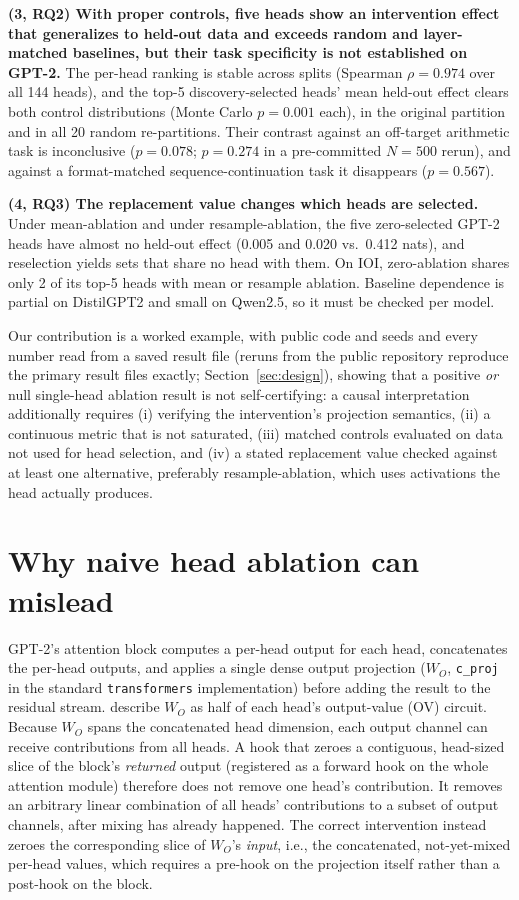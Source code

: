 \documentclass{article}
\begin{document}
\textbf{(3, RQ2) With proper controls, five heads show an
intervention effect that generalizes to held-out data and exceeds random
and layer-matched baselines, but
their task specificity is not established on GPT-2.} The per-head
ranking is stable across splits (Spearman $\rho=0.974$ over all 144
heads), and the top-5 discovery-selected heads' mean held-out effect
clears both control distributions (Monte Carlo $p=0.001$ each), in the
original partition and in all 20 random re-partitions. Their contrast
against an off-target arithmetic task is inconclusive ($p=0.078$; $p=0.274$
in a pre-committed $N=500$ rerun), and against a format-matched
sequence-continuation task it disappears ($p=0.567$).

\textbf{(4, RQ3) The replacement value changes which heads are selected.}
Under mean-ablation and under resample-ablation, the five zero-selected
GPT-2 heads have almost no held-out effect (0.005 and 0.020 vs.\ 0.412
nats), and reselection yields sets that share no head with them. On IOI, zero-ablation shares only 2 of its top-5 heads
with mean or resample ablation. Baseline dependence is partial on
DistilGPT2 and small on Qwen2.5, so it must be checked per model.

Our contribution is a worked example, with public code and seeds and
every number read from a saved result file (reruns from the public
repository reproduce the primary result files exactly; Section~\ref{sec:design}), showing that a
positive \emph{or} null single-head ablation result is not
self-certifying: a causal interpretation additionally requires (i)
verifying the intervention's projection semantics, (ii) a continuous
metric that is not saturated, (iii) matched controls evaluated on
data not used for head selection, and (iv) a stated replacement value
checked against at least one alternative, preferably resample-ablation,
which uses activations the head actually produces.


\section{Why naive head ablation can mislead}
\label{sec:background}

GPT-2's attention block computes a per-head output for each head,
concatenates the per-head outputs, and applies a single dense output
projection ($W_O$, \texttt{c\_proj} in the standard \texttt{transformers}
implementation) before adding the result to the residual stream.
\citet{elhage2021framework} describe $W_O$ as half of each
head's output-value (OV) circuit. Because $W_O$ spans the concatenated head dimension,
each output channel can receive contributions from all heads.
A hook that zeroes a contiguous, head-sized slice of the block's
\emph{returned} output (registered as a forward hook on the whole
attention module) therefore does not remove one head's contribution. It
removes an arbitrary linear combination of all heads' contributions to a
subset of output channels, after mixing has already happened. The
correct intervention instead zeroes the corresponding slice of $W_O$'s
\emph{input}, i.e., the concatenated, not-yet-mixed per-head values,
which requires a pre-hook on the projection itself rather than a
post-hook on the block.
\end{document}
